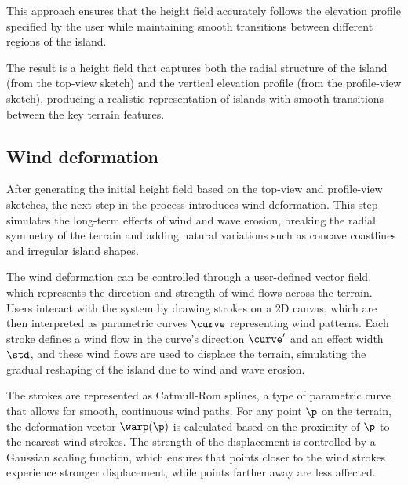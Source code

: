 This approach ensures that the height field accurately follows the elevation profile specified by the user while maintaining smooth transitions between different regions of the island.


The result is a height field that captures both the radial structure of the island (from the top-view sketch) and the vertical elevation profile (from the profile-view sketch), producing a realistic representation of islands with smooth transitions between the key terrain features.



\subsection{Wind deformation}

After generating the initial height field based on the top-view and profile-view sketches, the next step in the process introduces wind deformation. This step simulates the long-term effects of wind and wave erosion, breaking the radial symmetry of the terrain and adding natural variations such as concave coastlines and irregular island shapes.


The wind deformation can be controlled through a user-defined vector field, which represents the direction and strength of wind flows across the terrain. Users interact with the system by drawing strokes on a 2D canvas, which are then interpreted as parametric curves $\curve$ representing wind patterns. Each stroke defines a wind flow in the curve's direction $\curve'$ and an effect width $\std$, and these wind flows are used to displace the terrain, simulating the gradual reshaping of the island due to wind and wave erosion.

The strokes are represented as Catmull-Rom splines, a type of parametric curve that allows for smooth, continuous wind paths. For any point $\p$ on the terrain, the deformation vector $\warp(\p)$ is calculated based on the proximity of $\p$ to the nearest wind strokes. The strength of the displacement is controlled by a Gaussian scaling function, which ensures that points closer to the wind strokes experience stronger displacement, while points farther away are less affected.

